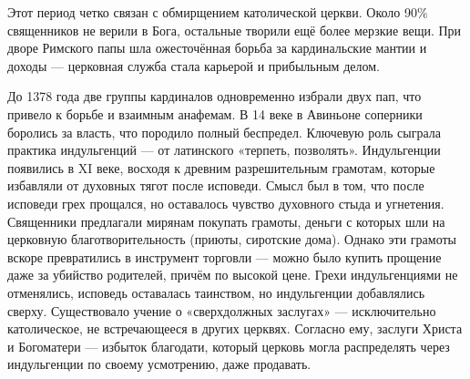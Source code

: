 
Этот период четко связан с обмирщением католической церкви. Около 90\% священников не верили в Бога, остальные творили ещё более мерзкие вещи. При дворе Римского папы шла ожесточённая борьба за кардинальские мантии и доходы --- церковная служба стала карьерой и прибыльным делом.

До 1378 года две группы кардиналов одновременно избрали двух пап, что привело к борьбе и взаимным анафемам. В 14 веке в Авиньоне соперники боролись за власть, что породило полный беспредел. Ключевую роль сыграла практика индульгенций --- от латинского «терпеть, позволять». Индульгенции появились в XI веке, восходя к древним разрешительным грамотам, которые избавляли от духовных тягот после исповеди.
Смысл был в том, что после исповеди грех прощался, но оставалось чувство духовного стыда и угнетения. Священники предлагали мирянам покупать грамоты, деньги с которых шли на церковную благотворительность (приюты, сиротские дома). Однако эти грамоты вскоре превратились в инструмент торговли --- можно было купить прощение даже за убийство родителей, причём по высокой цене.
Грехи индульгенциями не отменялись, исповедь оставалась таинством, но индульгенции добавлялись сверху. Существовало учение о «сверхдолжных заслугах» --- исключительно католическое, не встречающееся в других церквях. Согласно ему, заслуги Христа и Богоматери --- избыток благодати, который церковь могла распределять через индульгенции по своему усмотрению, даже продавать.

